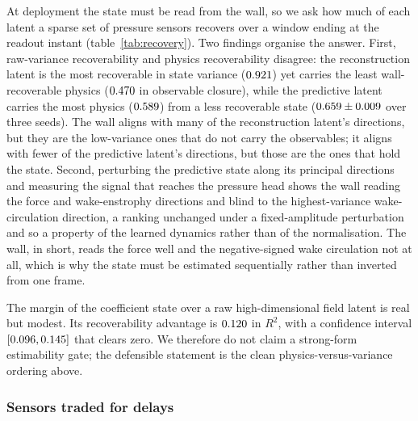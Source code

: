 At deployment the state must be read from the wall, so we ask how much of each latent a sparse set of pressure sensors recovers over a window ending at the readout instant (table~\ref{tab:recovery}). Two findings organise the answer. First, raw-variance recoverability and physics recoverability disagree: the reconstruction latent is the most recoverable in state variance ($0.921$) yet carries the least wall-recoverable physics ($0.470$ in observable closure), while the predictive latent carries the most physics ($0.589$) from a less recoverable state ($0.659 \pm 0.009$ over three seeds). The wall aligns with many of the reconstruction latent's directions, but they are the low-variance ones that do not carry the observables; it aligns with fewer of the predictive latent's directions, but those are the ones that hold the state. Second, perturbing the predictive state along its principal directions and measuring the signal that reaches the pressure head shows the wall reading the force and wake-enstrophy directions and blind to the highest-variance wake-circulation direction, a ranking unchanged under a fixed-amplitude perturbation and so a property of the learned dynamics rather than of the normalisation. The wall, in short, reads the force well and the negative-signed wake circulation not at all, which is why the state must be estimated sequentially rather than inverted from one frame.\re

The margin of the coefficient state over a raw high-dimensional field latent is real but modest. Its recoverability advantage is $0.120$ in $R^2$, with a confidence interval $[0.096, 0.145]$ that clears zero. We therefore do not claim a strong-form estimability gate; the defensible statement is the clean physics-versus-variance ordering above.\re

\subsubsection{Sensors traded for delays}
\label{sec:res_delays}

